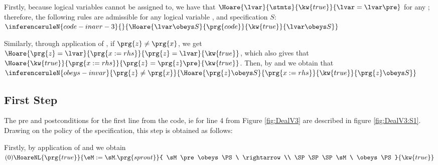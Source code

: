 Firstly, because logical variables cannot be assigned to, we have that   $\Hoare  {{\lvar} }  {\stmts}   {\kw{true}}  {{\lvar}=\lvar\pre}$ for any \stmts; therefore,  the following rules are admissible for any logical variable \lvar, and specification $S$:\\
$  \inferenceruleN {code-inavr-3} {
           
     }{
    \Hoare  {{\lvar} \obeys S}  {\prg{code}}   {\kw{true}}  {{\lvar} \obeys S}
     }
$

\vspace{.1in}
Similarly, through application of , if $\prg{z}\neq\prg{x}$, we get 
$ \Hoare  {\prg{z}=\lvar}  {\prg{x:=rhs}}   {\prg{z} =\lvar}  {\kw{true}}  $, which also gives that
$ \Hoare  {\kw{true}}  {\prg{x:=rhs}}   {\prg{z} =\prg{z}\pre}  {\kw{true}}  $. Then, 
by   and  we obtain that \\
$  \inferenceruleN {obeys-invar} {
           \prg{z}\neq \prg{x}
     }{
    \Hoare  {{\prg{z}} \obeys S}  {\prg{x:=rhs}}   {\kw{true}}  {{\prg{z}} \obeys S}
     }
$


\vspace{.1in}
\noindent


\subsection{First Step}

The pre and postconditions for the first line from the code, ie for line 4 from Figure \ref{fig:DealV3} are described in figure \ref{fig:DealV3:S1}.
Drawing on the  policy of the 
 specification, this step is obtained as follows:

Firstly, by application of  and  we obtain
\\
$  (0) 
\\ \HoareNL
      {\prg{true}}
       {\eM:=\sM.\prg{sprout}}
      { \sM\pre  \obeys \PS\ \rightarrow \\
      \SP\SP\SP \sM\ \obeys \PS}
         {\kw{true}} %
$
 \vspace{.1in}

